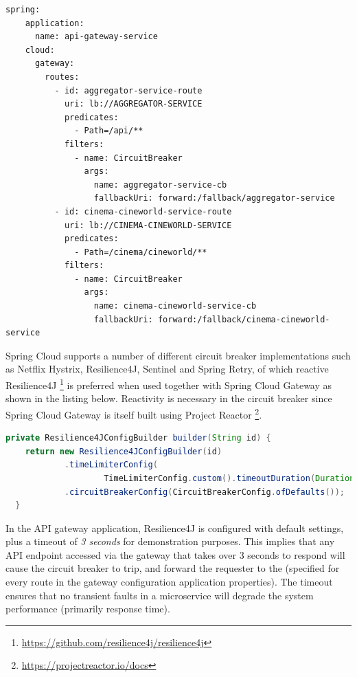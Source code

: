 \begin{lstlisting}[caption=Snippet from the API gateway service's application properties]
  spring:
    application:
      name: api-gateway-service
    cloud:
      gateway:
        routes:
          - id: aggregator-service-route
            uri: lb://AGGREGATOR-SERVICE
            predicates:
              - Path=/api/**
            filters:
              - name: CircuitBreaker
                args:
                  name: aggregator-service-cb
                  fallbackUri: forward:/fallback/aggregator-service
          - id: cinema-cineworld-service-route
            uri: lb://CINEMA-CINEWORLD-SERVICE
            predicates:
              - Path=/cinema/cineworld/**
            filters:
              - name: CircuitBreaker
                args:
                  name: cinema-cineworld-service-cb
                  fallbackUri: forward:/fallback/cinema-cineworld-service
\end{lstlisting}

Spring Cloud supports a number of different circuit breaker implementations such as Netflix Hystrix, Resilience4J, Sentinel and Spring Retry, of which reactive Resilience4J \footnote{\url{https://github.com/resilience4j/resilience4j}} is preferred when used together with Spring Cloud Gateway as shown in the listing below. Reactivity is necessary in the circuit breaker since Spring Cloud Gateway is itself built using Project Reactor \footnote{\url{https://projectreactor.io/docs}}.

\begin{lstlisting}[language=Java, caption=Circuit breaker configuration in API gateway application]
  private Resilience4JConfigBuilder builder(String id) {
    return new Resilience4JConfigBuilder(id)
            .timeLimiterConfig(
                    TimeLimiterConfig.custom().timeoutDuration(Duration.ofSeconds(3)).build())
            .circuitBreakerConfig(CircuitBreakerConfig.ofDefaults());
  }
\end{lstlisting}

In the API gateway application, Resilience4J is configured with default settings, plus a timeout of \textit{3 seconds} for demonstration purposes. This implies that any API endpoint accessed via the gateway that takes over 3 seconds to respond will cause the circuit breaker to trip, and forward the requester to the (specified for every route in the gateway configuration application properties). The timeout ensures that no transient faults in a microservice will degrade the system performance (primarily response time).

